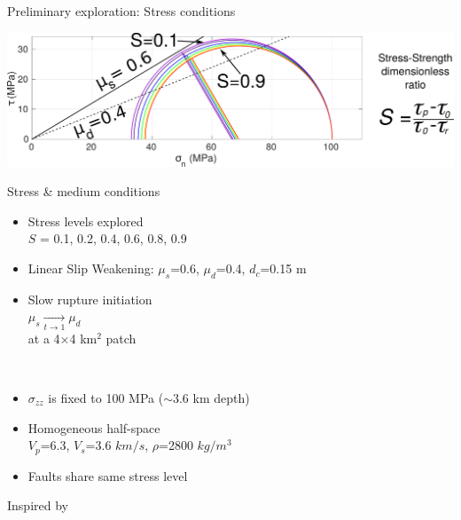 \documentclass{beamer}
\begin{document}
\begin{frame}
 {Preliminary exploration: Stress conditions}
 
 \begin{center}
  \includegraphics[width=0.9\linewidth]{images/MC_circle_2.pdf}
 \end{center}
  \centering \vskip -0.4cm Stress \& medium conditions \\
  \vskip 0.3cm
 \begin{minipage}{0.5\linewidth}
 \begin{itemize}
  \small \item \small Stress levels explored \\
  \small $S$ = 0.1, 0.2, 0.4, 0.6, 0.8, 0.9 \pause
  \vskip 0.2cm
  \item \small Linear Slip Weakening: $\mu_s$=0.6, 
  $\mu_d$=0.4, $d_c$=0.15 m \pause
  \vskip 0.2cm
  \item \small Slow rupture initiation \\ \hskip 0.5cm $\mu_s \xrightarrow[t \to 1] \ \mu_d$  \\ at a 4$\times$4 km$^2$ patch \pause
 \end{itemize}
 \end{minipage}
 \begin{minipage}{0.48\linewidth} \,
 \begin{itemize}
  \item \small $\sigma_{zz}$ is fixed to 100 MPa ($\sim$3.6 km depth) \pause
  \vskip 0.2cm
  \item \small Homogeneous half-space \\ $V_p$=6.3, $V_s$=3.6 $km/s$, $\rho$=2800 $kg/m^3$ \pause
  \vskip 0.2cm
  \item \small Faults share same stress level
 \end{itemize}
 \end{minipage}

 \hfill {\tiny Inspired by \cite{Aochi_2018_DAN}}
 
\end{frame}
\end{document}
